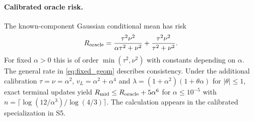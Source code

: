 \paragraph{Calibrated oracle risk.}
The known-component Gaussian conditional mean has risk
\begin{equation}\label{eq:oracle_general}
 R_{\rm oracle}=
 \frac{\tau^2\nu^2}{\alpha\tau^2+\nu^2}
 +\frac{\tau^2\nu^2}{\tau^2+\nu^2}.
\end{equation}
For fixed $\alpha>0$ this is of order $\min(\tau^2,\nu^2)$ with
constants depending on $\alpha$. The general rate in
\eqref{eq:fixed_geom} describes consistency. Under the additional
calibration $\tau=\nu=\alpha^2$, $v_L=\alpha^2+\alpha^4$ and
$\lambda=(1+\alpha^2)(1+\theta\alpha)$ for $|\theta|\le1$, exact
terminal updates yield $R_{\rm mid}\le R_{\rm oracle}+5\alpha^6$
for $\alpha\le10^{-5}$ with
$n=\lceil\log(12/\alpha^3)/\log(4/3)\rceil$. The calculation
appears in the calibrated specialization in S5.
